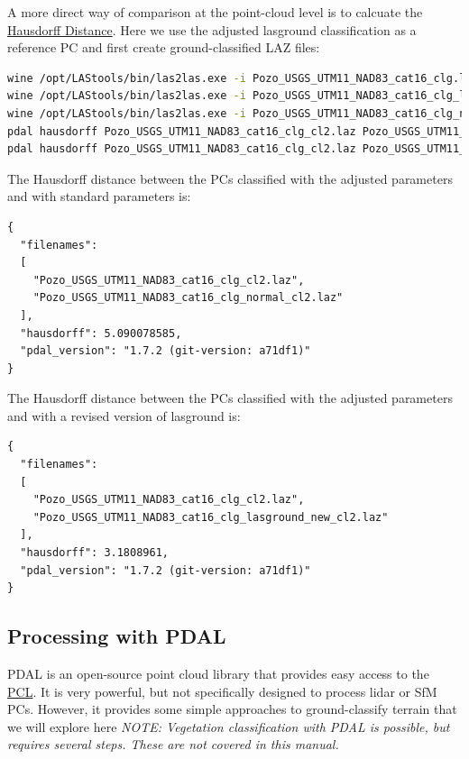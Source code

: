 \documentclass[a4paperpaper,,tablecaptionabove]{scrartcl}
\begin{document}
A more direct way of comparison at the point-cloud level is to calcuate
the \href{https://pdal.io/apps/hausdorff.html}{Hausdorff Distance}. Here
we use the adjusted lasground classification as a reference PC and first
create ground-classified LAZ files:

\begin{lstlisting}[language=bash]
wine /opt/LAStools/bin/las2las.exe -i Pozo_USGS_UTM11_NAD83_cat16_clg.laz -keep_class 2 -olaz -o Pozo_USGS_UTM11_NAD83_cat16_clg_cl2.laz
wine /opt/LAStools/bin/las2las.exe -i Pozo_USGS_UTM11_NAD83_cat16_clg_lasground_new.laz -keep_class 2 -olaz -o Pozo_USGS_UTM11_NAD83_cat16_clg_lasground_new_cl2.laz
wine /opt/LAStools/bin/las2las.exe -i Pozo_USGS_UTM11_NAD83_cat16_clg_normal.laz -keep_class 2 -olaz -o Pozo_USGS_UTM11_NAD83_cat16_clg_normal_cl2.laz
pdal hausdorff Pozo_USGS_UTM11_NAD83_cat16_clg_cl2.laz Pozo_USGS_UTM11_NAD83_cat16_clg_normal_cl2.laz
pdal hausdorff Pozo_USGS_UTM11_NAD83_cat16_clg_cl2.laz Pozo_USGS_UTM11_NAD83_cat16_clg_lasground_new_cl2.laz
\end{lstlisting}

The Hausdorff distance between the PCs classified with the adjusted
parameters and with standard parameters is:

\begin{lstlisting}
{
  "filenames":
  [
    "Pozo_USGS_UTM11_NAD83_cat16_clg_cl2.laz",
    "Pozo_USGS_UTM11_NAD83_cat16_clg_normal_cl2.laz"
  ],
  "hausdorff": 5.090078585,
  "pdal_version": "1.7.2 (git-version: a71df1)"
}
\end{lstlisting}

The Hausdorff distance between the PCs classified with the adjusted
parameters and with a revised version of lasground is:

\begin{lstlisting}
{
  "filenames":
  [
    "Pozo_USGS_UTM11_NAD83_cat16_clg_cl2.laz",
    "Pozo_USGS_UTM11_NAD83_cat16_clg_lasground_new_cl2.laz"
  ],
  "hausdorff": 3.1808961,
  "pdal_version": "1.7.2 (git-version: a71df1)"
}
\end{lstlisting}

\hypertarget{processing-with-pdal}{%
\subsection{Processing with PDAL}\label{processing-with-pdal}}

PDAL is an open-source point cloud library that provides easy access to
the \href{http://pointclouds.org/}{PCL}. It is very powerful, but not
specifically designed to process lidar or SfM PCs. However, it provides
some simple approaches to ground-classify terrain that we will explore
here \emph{NOTE: Vegetation classification with PDAL is possible, but
requires several steps. These are not covered in this manual.}
\end{document}
